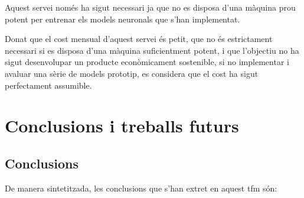 \documentclass[CAT,BIB]{TFUOC}%
\begin{document}
    Aquest servei només ha sigut necessari
    ja que no es disposa d'una màquina prou potent
    per entrenar els models neuronals que s'han implementat.

    Donat que el cost mensual d'aquest servei és petit,
    que no és estrictament necessari
    si es disposa d'una màquina suficientment potent,
    i que l'objectiu no ha sigut desenvolupar un producte econòmicament sostenible,
    si no implementar i avaluar una sèrie de models prototip,
    es considera que el cost ha sigut perfectament assumible.


\chapter{Conclusions i treballs futurs}
\label{c:conclusions}

    \section{Conclusions}
    \label{s:conclusions}

        De manera sintetitzada,
        les conclusions que s'han extret en aquest \gls{tfm} són:
\end{document}
